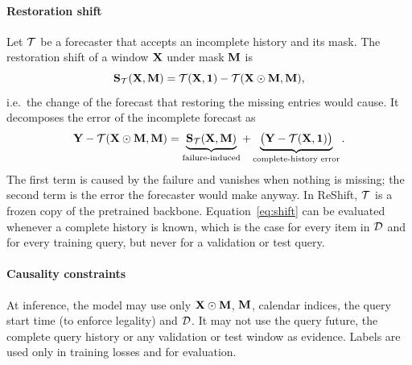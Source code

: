 \paragraph{Restoration shift}
Let $\mathcal{T}$ be a forecaster that accepts an incomplete history and its mask. The restoration shift of a window $\mathbf{X}$ under mask $\mathbf{M}$ is
\begin{equation}
\mathbf{S}_{\mathcal{T}}(\mathbf{X},\mathbf{M})=\mathcal{T}(\mathbf{X},\mathbf{1})-\mathcal{T}(\mathbf{X}\odot\mathbf{M},\mathbf{M}),
\label{eq:shift}
\end{equation}
i.e.\ the change of the forecast that restoring the missing entries would cause. It decomposes the error of the incomplete forecast as
\begin{equation}
\mathbf{Y}-\mathcal{T}(\mathbf{X}\odot\mathbf{M},\mathbf{M})=\underbrace{\mathbf{S}_{\mathcal{T}}(\mathbf{X},\mathbf{M})}_{\text{failure-induced}}+\underbrace{\big(\mathbf{Y}-\mathcal{T}(\mathbf{X},\mathbf{1})\big)}_{\text{complete-history error}} .
\label{eq:decomp}
\end{equation}
The first term is caused by the failure and vanishes when nothing is missing; the second term is the error the forecaster would make anyway. In ReShift, $\mathcal{T}$ is a frozen copy of the pretrained backbone. Equation~\eqref{eq:shift} can be evaluated whenever a complete history is known, which is the case for every item in $\mathcal{D}$ and for every training query, but never for a validation or test query.

\paragraph{Causality constraints}
At inference, the model may use only $\mathbf{X}\odot\mathbf{M}$, $\mathbf{M}$, calendar indices, the query start time (to enforce legality) and $\mathcal{D}$. It may not use the query future, the complete query history or any validation or test window as evidence. Labels are used only in training losses and for evaluation.
